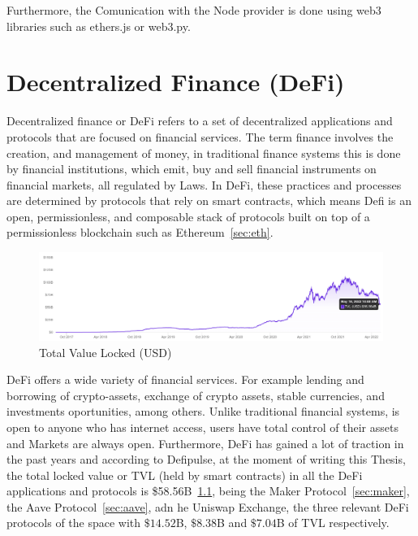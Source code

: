 \documentclass[11pt,a4paper]{report}
\begin{document}
Furthermore, the Comunication with the Node provider is done using web3 libraries such as ethers.js\cite{ethersjs} or web3.py\cite{web3py}.
\chapter{Decentralized Finance (DeFi)} \label{ch:defi}
Decentralized finance or DeFi\cite{article:cefidefi}\cite{article:defi} refers to a set of decentralized applications and protocols that are focused on financial services. The term finance\cite{wiki:Finance} involves the creation, and management of money, in traditional finance systems this is done by financial institutions\cite{wiki:Financial_institution}, which emit, buy and sell financial instruments\cite{wiki:Financial_instrument} on financial markets\cite{wiki:Financial_market}, all regulated by Laws. In DeFi,  these practices and processes are determined by protocols that rely on smart contracts, which means Defi is an open, permissionless, and composable stack of protocols built on top of a permissionless blockchain such as Ethereum~\ref{sec:eth}. 
\begin{figure}[htp]
	\centering
	\includegraphics[width=1\textwidth]{./images/tvl}
	\caption{Total Value Locked (USD)\cite{defipulse}}
	\label{fig:tvl}
\end{figure}

DeFi offers a wide variety of financial services. For example lending and borrowing of crypto-assets, exchange of crypto assets, stable currencies, and investments oportunities, among others. Unlike traditional financial systems, is open to anyone who has internet access, users have total control of their assets and Markets are always open. Furthermore, DeFi has gained a lot of traction in the past years and according to Defipulse\cite{defipulse}, at the moment of writing this Thesis, the total locked value or TVL (held by smart contracts) in all the DeFi applications and protocols is \$58.56B~\ref{fig:tvl}, being the Maker Protocol~\ref{sec:maker}, the Aave Protocol~\ref{sec:aave}, adn he Uniswap Exchange\cite{uniswap}, the three relevant DeFi protocols of the space with $\$14.52$B, $\$8.38$B and $\$7.04$B of TVL respectively. 
\end{document}
